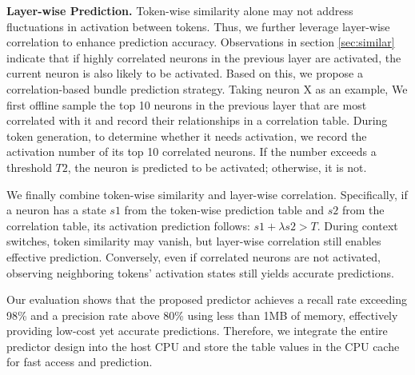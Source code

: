 \textbf{Layer-wise Prediction. } 
Token-wise similarity alone may not address fluctuations in activation between tokens. Thus, we further leverage layer-wise correlation to enhance prediction accuracy. Observations in section \ref{sec:similar} indicate that if highly correlated neurons in the previous layer are activated, the current neuron is also likely to be activated. Based on this, we propose a correlation-based bundle prediction strategy.
Taking neuron X as an example, We first offline sample the top 10 neurons in the previous layer that are most correlated with it and record their relationships in a correlation table. During token generation, to determine whether it needs activation, we record the activation number of its top 10 correlated neurons. If the number exceeds a threshold \( T2 \), the neuron is predicted to be activated; otherwise, it is not.

We finally combine token-wise similarity and layer-wise correlation. Specifically, if a neuron has a state \( s1 \) from the token-wise prediction table and \( s2 \) from the correlation table, its activation prediction follows: \( s1 + \lambda s2 > T \). During context switches, token similarity may vanish, but layer-wise correlation still enables effective prediction. Conversely, even if correlated neurons are not activated, observing neighboring tokens' activation states still yields accurate predictions.

Our evaluation shows that the proposed predictor achieves a recall rate exceeding 98\% and a precision rate above 80\% using less than 1MB of memory, effectively providing low-cost yet accurate predictions.
Therefore, we integrate the entire predictor design into the host CPU and store the table values in the CPU cache for fast access and prediction.



